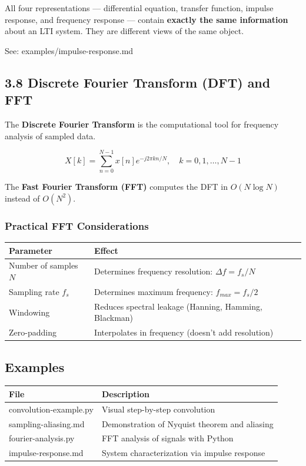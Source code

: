 \documentclass[11pt,a4paper]{book}
\begin{document}
All four representations — differential equation, transfer function, impulse response, and frequency response — contain \textbf{exactly the same information} about an LTI system. They are different views of the same object.

See: examples/impulse-response.md

\medskip\noindent\hrulefill\medskip

\subsection{3.8 Discrete Fourier Transform (DFT) and FFT}

The \textbf{Discrete Fourier Transform} is the computational tool for frequency analysis of sampled data.

\[X[k] = \sum_{n=0}^{N-1} x[n] e^{-j2\pi kn/N}, \quad k = 0, 1, \ldots, N-1\]

The \textbf{Fast Fourier Transform (FFT)} computes the DFT in $O(N \log N)$ instead of $O(N^2)$.

\subsubsection{Practical FFT Considerations}

\begin{center}
\begin{tabular}{|l|l|}
\hline
Parameter & Effect \\
\hline
Number of samples $N$ & Determines frequency resolution: $\Delta f = f_s / N$ \\
Sampling rate $f_s$ & Determines maximum frequency: $f_{max} = f_s / 2$ \\
Windowing & Reduces spectral leakage (Hanning, Hamming, Blackman) \\
Zero-padding & Interpolates in frequency (doesn't add resolution) \\
\hline
\end{tabular}
\end{center}

\medskip\noindent\hrulefill\medskip

\subsection{Examples}

\begin{center}
\begin{tabular}{|l|l|}
\hline
File & Description \\
\hline
convolution-example.py & Visual step-by-step convolution \\
sampling-aliasing.md & Demonstration of Nyquist theorem and aliasing \\
fourier-analysis.py & FFT analysis of signals with Python \\
impulse-response.md & System characterization via impulse response \\
\hline
\end{tabular}
\end{center}
\end{document}
